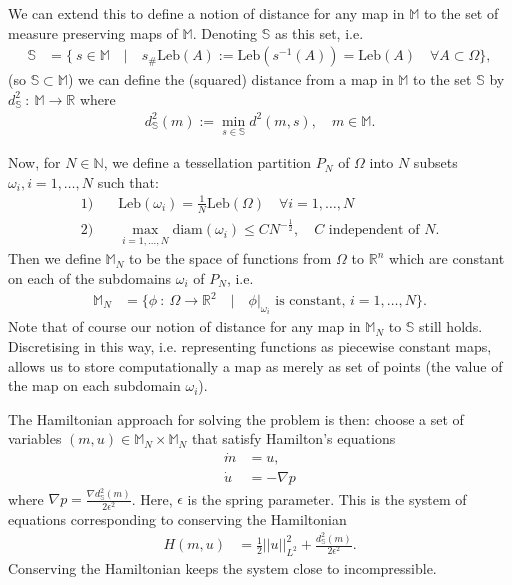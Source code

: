 \documentclass[11pt, oneside]{article}   	%
\newcommand{\R}{\mathbb{R}}
\newcommand{\MN}{\mathbb{M}_N}
\newcommand{\dsmsq}{d^{2}_{\mathbb{S}}(m)}
\newcommand{\graddsmsq}{\nabla{d^{2}_{\mathbb{S}}(m)}}
\newcommand{\M}{\mathbb{M}}
\newcommand{\N}{\mathbb{N}}
\newcommand{\Sb}{\mathbb{S}}
\newcommand{\Leb}{\mathrm{Leb}}
\begin{document}
We can extend this to define a notion of distance for any map in \(\M\) to the set of measure preserving maps of \(\M\). Denoting \(\Sb\) as this set, i.e. 
\begin{align}
\Sb &= \{ \: s \in \M \quad | \quad s_{\#}\Leb(A) := \Leb(s^{-1}(A)) = \Leb(A) \quad \forall A \subset \Omega \},
\end{align}
(so \(\Sb \subset \M\)) we can define the (squared) distance from a map in \(\M\) to the set \(\Sb\) by \(d^2_\Sb \: : \: \M \to \R\) where
\begin{align}
\dsmsq := \min_{s \in \mathbb{S}} d^2(m, s), \quad m \in \M.
\end{align}

Now, for \(N \in \N\), we define a tessellation partition \(P_N\) of \(\Omega\) into \(N\) subsets \(\omega_i, i=1,\dots,N\) such that:
\begin{align}
1)& \quad \Leb(\omega_i) = \frac{1}{N}\Leb(\Omega) \quad \forall i = 1,\dots,N \\
2)& \quad \max_{i = 1,\dots,N} \mathrm{diam}(\omega_i) \le CN^{-\frac{1}{2}}, \quad C \text{ independent of } N.
\end{align}
Then we define \(\MN\) to be the space of functions from \(\Omega\) to \(\R^n\) which are constant on each of the subdomains \(\omega_i\) of \(P_N\), i.e.
\begin{align}
\MN &= \{ \phi \: : \: \Omega \to \R^2 \quad | \quad \phi | _{\omega_i} \text{ is constant, } i = 1,\dots,N\}.
\end{align}
Note that of course our notion of distance for any map in \(\MN\) to \(\Sb\) still holds. Discretising in this way, i.e. representing functions as piecewise constant maps, allows us to store computationally a map as merely as set of points (the value of the map on each subdomain \(\omega_i\)).

The Hamiltonian approach for solving the problem is then: choose a set of variables \((m, u) \in \MN \times \MN \) that satisfy Hamilton's equations
\begin{align} 
\dot{m} &= u, \\
\dot{u} &= - \nabla p
\end{align}
where \(\nabla p = \frac{\graddsmsq}{2\epsilon^2}\). Here, \(\epsilon\) is the spring parameter. This is the system of equations corresponding to conserving the Hamiltonian
\begin{align} 
H(m, u) &= \frac{1}{2} ||u||^2_{L^2} + \frac{\dsmsq}{2\epsilon^2}.
\end{align}
Conserving the Hamiltonian keeps the system close to incompressible. 
\end{document}
